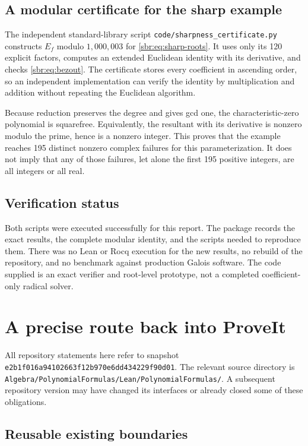 \documentclass[11pt,letterpaper]{article}
\numberwithin{equation}{section}
\theoremstyle{definition}
\theoremstyle{remark}
\newcommand{\src}[1]{\texttt{\nolinkurl{#1}}}
\newcommand{\snapshot}{\texttt{e2b1f016a94102663f12b970e6dd434229f90d01}}
\begin{document}
\subsection{A modular certificate for the sharp example}

The independent standard-library script
\src{code/sharpness_certificate.py} constructs $E_f$ modulo $1{,}000{,}003$
for \cref{sbr:eq:sharp-roots}. It uses only its 120 explicit factors, computes
an extended Euclidean identity with its derivative, and checks
\cref{sbr:eq:bezout}. The certificate stores every coefficient in ascending
order, so an independent implementation can verify the identity by
multiplication and addition without repeating the Euclidean algorithm.

Because reduction preserves the degree and gives gcd one, the
characteristic-zero polynomial is squarefree. Equivalently, the resultant
with its derivative is nonzero modulo the prime, hence is a nonzero
integer. This proves that the example reaches 195 distinct nonzero
complex failures for this parameterization. It does not imply that any of
those failures, let alone the first 195 positive integers, are all
integers or all real.

\subsection{Verification status}

Both scripts were executed successfully for this report. The package
records the exact results, the complete modular identity, and the scripts
needed to reproduce them. There was no Lean or Rocq execution for the new
results, no rebuild of the repository, and no benchmark against production
Galois software. The code supplied is an exact verifier and root-level
prototype, not a completed coefficient-only radical solver.

\section{A precise route back into ProveIt}
\label{sbr:sec:integration}

All repository statements here refer to snapshot \snapshot. The relevant
source directory is
\src{Algebra/PolynomialFormulas/Lean/PolynomialFormulas/}.
A subsequent repository version may have changed its interfaces or already
closed some of these obligations.

\subsection{Reusable existing boundaries}
\end{document}
